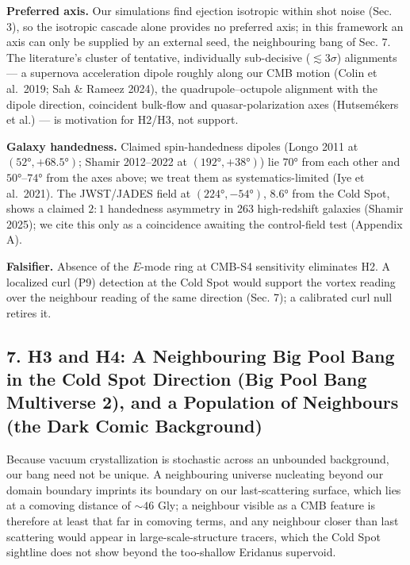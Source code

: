 \documentclass[
]{article}
\begin{document}
\textbf{Preferred axis.} Our simulations find ejection isotropic within
shot noise (Sec. 3), so the isotropic cascade alone provides no
preferred axis; in this framework an axis can only be supplied by an
external seed, the neighbouring bang of Sec. 7. The literature's cluster
of tentative, individually sub-decisive (\(\lesssim 3\sigma\))
alignments --- a supernova acceleration dipole roughly along our CMB
motion (Colin et al.~2019; Sah \& Rameez 2024), the quadrupole--octupole
alignment with the dipole direction, coincident bulk-flow and
quasar-polarization axes (Hutsemékers et al.) --- is motivation for
H2/H3, not support.

\textbf{Galaxy handedness.} Claimed spin-handedness dipoles (Longo 2011
at \((52°, +68.5°)\); Shamir 2012--2022 at \((192°, +38°)\)) lie \(70°\)
from each other and \(50°\)--\(74°\) from the axes above; we treat them
as systematics-limited (Iye et al.~2021). The JWST/JADES field at
\((224°, -54°)\), \(8.6°\) from the Cold Spot, shows a claimed
\(2\!:\!1\) handedness asymmetry in 263 high-redshift galaxies (Shamir
2025); we cite this only as a coincidence awaiting the control-field
test (Appendix A).

\textbf{Falsifier.} Absence of the \(E\)-mode ring at CMB-S4 sensitivity
eliminates H2. A localized curl (P9) detection at the Cold Spot would
support the vortex reading over the neighbour reading of the same
direction (Sec. 7); a calibrated curl null retires it.

\hypertarget{h3-and-h4-a-neighbouring-big-pool-bang-in-the-cold-spot-direction-big-pool-bang-multiverse-2-and-a-population-of-neighbours-the-dark-comic-background}{%
\subsection{\texorpdfstring{\textbf{7. H3 and H4: A Neighbouring Big
Pool Bang in the Cold Spot Direction (Big Pool Bang Multiverse 2), and a
Population of Neighbours (the Dark Comic
Background)}}{7. H3 and H4: A Neighbouring Big Pool Bang in the Cold Spot Direction (Big Pool Bang Multiverse 2), and a Population of Neighbours (the Dark Comic Background)}}\label{h3-and-h4-a-neighbouring-big-pool-bang-in-the-cold-spot-direction-big-pool-bang-multiverse-2-and-a-population-of-neighbours-the-dark-comic-background}}

Because vacuum crystallization is stochastic across an unbounded
background, our bang need not be unique. A neighbouring universe
nucleating beyond our domain boundary imprints its boundary on our
last-scattering surface, which lies at a comoving distance of
\(\sim\!46\) Gly; a neighbour visible as a CMB feature is therefore at
least that far in comoving terms, and any neighbour closer than last
scattering would appear in large-scale-structure tracers, which the Cold
Spot sightline does not show beyond the too-shallow Eridanus supervoid.
\end{document}
